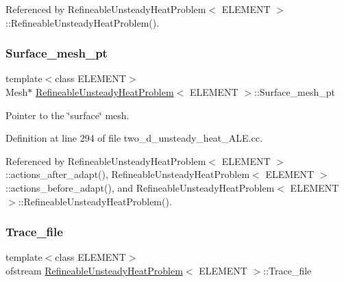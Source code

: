 Referenced by Refineable\+Unsteady\+Heat\+Problem$<$ E\+L\+E\+M\+E\+N\+T $>$\+::\+Refineable\+Unsteady\+Heat\+Problem().

\mbox{\label{classRefineableUnsteadyHeatProblem_a2febbb317a74e427bf6304235d779fe6}} 
\subsubsection{\texorpdfstring{Surface\+\_\+mesh\+\_\+pt}{Surface\_mesh\_pt}}
{\footnotesize\ttfamily template$<$class E\+L\+E\+M\+E\+NT$>$ \\
Mesh$\ast$ \hyperlink{classRefineableUnsteadyHeatProblem}{Refineable\+Unsteady\+Heat\+Problem}$<$ E\+L\+E\+M\+E\+NT $>$\+::Surface\+\_\+mesh\+\_\+pt\hspace{0.3cm}{\ttfamily [private]}}



Pointer to the \char`\"{}surface\char`\"{} mesh. 



Definition at line 294 of file two\+\_\+d\+\_\+unsteady\+\_\+heat\+\_\+\+A\+L\+E.\+cc.



Referenced by Refineable\+Unsteady\+Heat\+Problem$<$ E\+L\+E\+M\+E\+N\+T $>$\+::actions\+\_\+after\+\_\+adapt(), Refineable\+Unsteady\+Heat\+Problem$<$ E\+L\+E\+M\+E\+N\+T $>$\+::actions\+\_\+before\+\_\+adapt(), and Refineable\+Unsteady\+Heat\+Problem$<$ E\+L\+E\+M\+E\+N\+T $>$\+::\+Refineable\+Unsteady\+Heat\+Problem().

\mbox{\label{classRefineableUnsteadyHeatProblem_a8f62ba78fb856d2e07b00254ca7a0e6a}} 
\subsubsection{\texorpdfstring{Trace\+\_\+file}{Trace\_file}}
{\footnotesize\ttfamily template$<$class E\+L\+E\+M\+E\+NT$>$ \\
ofstream \hyperlink{classRefineableUnsteadyHeatProblem}{Refineable\+Unsteady\+Heat\+Problem}$<$ E\+L\+E\+M\+E\+NT $>$\+::Trace\+\_\+file\hspace{0.3cm}{\ttfamily [private]}}



